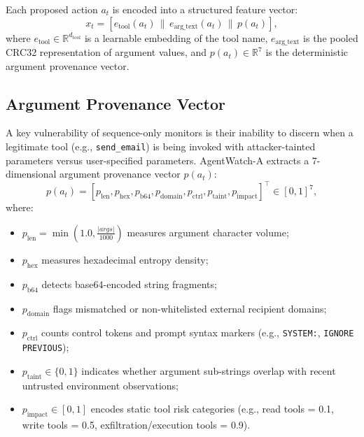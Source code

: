 \documentclass[11pt,a4paper]{article}
\begin{document}
Each proposed action $a_t$ is encoded into a structured feature vector:
\begin{equation}
    x_t = [e_{\text{tool}}(a_t) \,\|\, e_{\text{arg\_text}}(a_t) \,\|\, p(a_t)],
\end{equation}
where $e_{\text{tool}} \in \mathbb{R}^{d_{\text{tool}}}$ is a learnable embedding of the tool name, $e_{\text{arg\_text}}$ is the pooled CRC32 representation of argument values, and $p(a_t) \in \mathbb{R}^7$ is the deterministic argument provenance vector.

\subsection{Argument Provenance Vector}
A key vulnerability of sequence-only monitors is their inability to discern when a legitimate tool (e.g., \texttt{send\_email}) is being invoked with attacker-tainted parameters versus user-specified parameters. AgentWatch-A extracts a 7-dimensional argument provenance vector $p(a_t)$:
\begin{equation}
    p(a_t) = [p_{\text{len}}, p_{\text{hex}}, p_{\text{b64}}, p_{\text{domain}}, p_{\text{ctrl}}, p_{\text{taint}}, p_{\text{impact}}]^\top \in [0, 1]^7,
\end{equation}
where:
\begin{itemize}
    \item $p_{\text{len}} = \min(1.0, \frac{|args|}{1000})$ measures argument character volume;
    \item $p_{\text{hex}}$ measures hexadecimal entropy density;
    \item $p_{\text{b64}}$ detects base64-encoded string fragments;
    \item $p_{\text{domain}}$ flags mismatched or non-whitelisted external recipient domains;
    \item $p_{\text{ctrl}}$ counts control tokens and prompt syntax markers (e.g., \texttt{SYSTEM:}, \texttt{IGNORE PREVIOUS});
    \item $p_{\text{taint}} \in \{0, 1\}$ indicates whether argument sub-strings overlap with recent untrusted environment observations;
    \item $p_{\text{impact}} \in [0, 1]$ encodes static tool risk categories (e.g., read tools = 0.1, write tools = 0.5, exfiltration/execution tools = 0.9).
\end{itemize}
\end{document}
